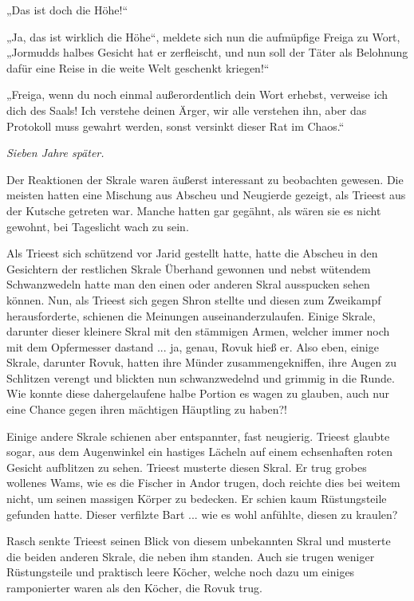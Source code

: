 „Das ist doch die Höhe!“

„Ja, das ist wirklich die Höhe“, meldete sich nun die aufmüpfige Freiga zu Wort, „Jormudds halbes Gesicht hat er zerfleischt, und nun soll der Täter als Belohnung dafür eine Reise in die weite Welt geschenkt kriegen!“

„Freiga, wenn du noch einmal außerordentlich dein Wort erhebst, verweise ich dich des Saals! Ich verstehe deinen Ärger, wir alle verstehen ihn, aber das Protokoll muss gewahrt werden, sonst versinkt dieser Rat im Chaos.“








\textit{Sieben Jahre später.}\bigskip




Der Reaktionen der Skrale waren äußerst interessant zu beobachten gewesen. Die meisten hatten eine Mischung aus Abscheu und Neugierde gezeigt, als Trieest aus der Kutsche getreten war. Manche hatten gar gegähnt, als wären sie es nicht gewohnt, bei Tageslicht wach zu sein.

Als Trieest sich schützend vor Jarid gestellt hatte, hatte die Abscheu in den Gesichtern der restlichen Skrale Überhand gewonnen und nebst wütendem Schwanzwedeln hatte man den einen oder anderen Skral ausspucken sehen können. Nun, als Trieest sich gegen Shron stellte und diesen zum Zweikampf herausforderte, schienen die Meinungen auseinanderzulaufen. Einige Skrale, darunter dieser kleinere Skral mit den stämmigen Armen, welcher immer noch mit dem Opfermesser dastand ... ja, genau, Rovuk hieß er. Also eben, einige Skrale, darunter Rovuk, hatten ihre Münder zusammengekniffen, ihre Augen zu Schlitzen verengt und blickten nun schwanzwedelnd und grimmig in die Runde. Wie konnte diese dahergelaufene halbe Portion es wagen zu glauben, auch nur eine Chance gegen ihren mächtigen Häuptling zu haben?!

Einige andere Skrale schienen aber entspannter, fast neugierig. Trieest glaubte sogar, aus dem Augenwinkel ein hastiges Lächeln auf einem echsenhaften roten Gesicht aufblitzen zu sehen. Trieest musterte diesen Skral. Er trug grobes wollenes Wams, wie es die Fischer in Andor trugen, doch reichte dies bei weitem nicht, um seinen massigen Körper zu bedecken. Er schien kaum Rüstungsteile gefunden hatte. Dieser verfilzte Bart ... wie es wohl anfühlte, diesen zu kraulen?

Rasch senkte Trieest seinen Blick von diesem unbekannten Skral und musterte die beiden anderen Skrale, die neben ihm standen. Auch sie trugen weniger Rüstungsteile und praktisch leere Köcher, welche noch dazu um einiges ramponierter waren als den Köcher, die Rovuk trug.


